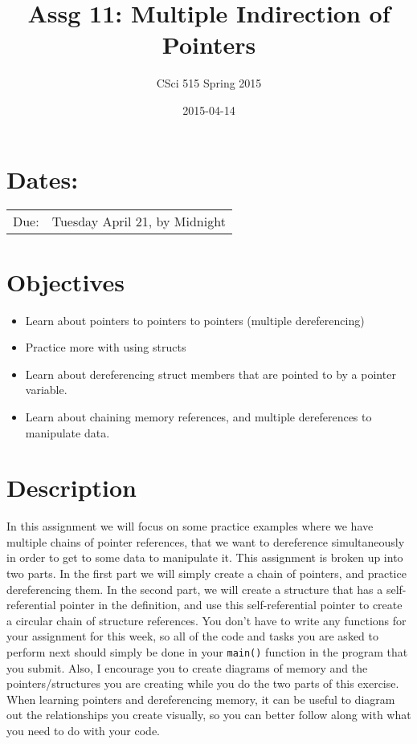 \documentclass[11pt]{article}
\title{Assg 11: Multiple Indirection of Pointers}
\author{CSci 515 Spring 2015}
\date{2015-04-14}
\begin{document}
\maketitle


\section*{Dates:}
\label{sec-1}


\begin{center}
\begin{tabular}{ll}
 Due:  &  Tuesday April 21, by Midnight  \\
\end{tabular}
\end{center}
\section*{Objectives}
\label{sec-2}

\begin{itemize}
\item Learn about pointers to pointers to pointers (multiple dereferencing)
\item Practice more with using structs
\item Learn about dereferencing struct members that are pointed to by a pointer
  variable.
\item Learn about chaining memory references, and multiple dereferences to 
  manipulate data.
\end{itemize}
\section*{Description}
\label{sec-3}

In this assignment we will focus on some practice examples where we
have multiple chains of pointer references, that we want to
dereference simultaneously in order to get to some data to manipulate
it.  This assignment is broken up into two parts.  In the first part
we will simply create a chain of pointers, and practice dereferencing
them.  In the second part, we will create a structure that has a
self-referential pointer in the definition, and use this
self-referential pointer to create a circular chain of structure
references.  You don't have to write any functions for your assignment
for this week, so all of the code and tasks you are asked to perform
next should simply be done in your \verb~main()~ function in the program
that you submit.  Also, I encourage you to create diagrams of memory
and the pointers/structures you are creating while you do the two
parts of this exercise.  When learning pointers and dereferencing
memory, it can be useful to diagram out the relationships you create
visually, so you can better follow along with what you need to do with
your code.
\end{document}
